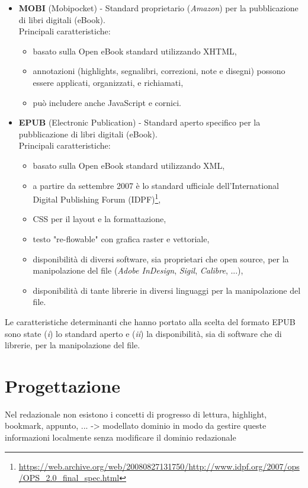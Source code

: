 \begin{itemize}
    \item \textbf{MOBI} (Mobipocket) - Standard proprietario (\textit{Amazon}) per la pubblicazione di libri digitali (eBook).\\
    Principali caratteristiche:
    \begin{itemize}
        \item basato sulla Open eBook standard utilizzando XHTML,
        \item annotazioni (highlights, segnalibri, correzioni, note e disegni) possono essere applicati, organizzati, e richiamati,
        \item può includere anche JavaScript e cornici.
    \end{itemize}
    \item \textbf{EPUB} (Electronic Publication) - Standard aperto specifico per la pubblicazione di libri digitali (eBook).\\
    Principali caratteristiche:
    \begin{itemize}
        \item basato sulla Open eBook standard utilizzando XML,
        \item a partire da settembre 2007 è lo standard ufficiale dell'International Digital Publishing Forum (IDPF)\footnote{\url{https://web.archive.org/web/20080827131750/http://www.idpf.org/2007/ops/OPS_2.0_final_spec.html}},
        \item CSS per il layout e la formattazione,
        \item testo "re-flowable" con grafica raster e vettoriale,
        \item disponibilità di diversi software, sia proprietari che open source, per la manipolazione del file (\textit{Adobe InDesign}, \textit{Sigil}, \textit{Calibre}, ...),
        \item disponibilità di tante librerie in diversi linguaggi per la manipolazione del file.
    \end{itemize}
\end{itemize}
Le caratteristiche determinanti che hanno portato alla scelta del formato EPUB sono state (\textit{i}) lo standard aperto e (\textit{ii}) la disponibilità, sia di software che di librerie, per la manipolazione del file. 

\section{Progettazione}
Nel redazionale non esistono i concetti di progresso di lettura, highlight, bookmark, appunto, ... -> modellato dominio in modo da gestire queste informazioni localmente senza modificare il dominio redazionale

